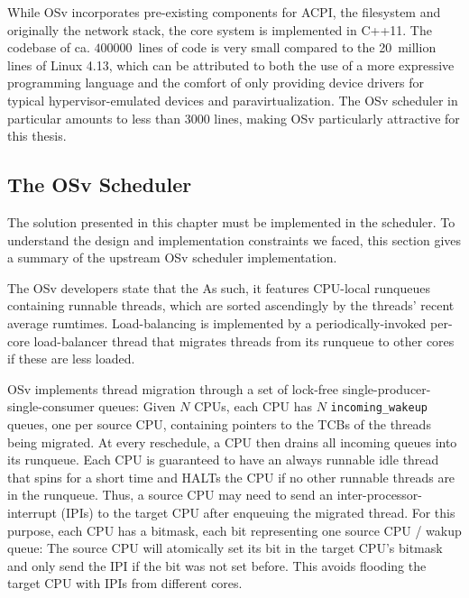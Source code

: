 \documentclass[12pt,a4paper]{book}
\begin{document}
While OSv incorporates pre-existing components for ACPI, the filesystem and originally the network stack, the core system is implemented in C++11.
The codebase of ca. $400000$~lines of code is very small compared to the 20~million lines of Linux 4.13, %
which can be attributed to both the use of a more expressive programming language and the comfort of only providing device drivers for typical hypervisor-emulated devices and paravirtualization.
The OSv scheduler in particular amounts to less than 3000 lines, making OSv particularly attractive for this thesis.%
~\cite{osvMain}

\subsection{The OSv Scheduler}\label{ch:di:osv:sched}
The solution presented in this chapter must be implemented in the scheduler.
To understand the design and implementation constraints we faced, this section gives a summary of the upstream OSv scheduler implementation.

The OSv developers state that the 
As such, it features CPU-local runqueues containing runnable threads, which are sorted ascendingly by the threads' recent average rumtimes.
Load-balancing is implemented by a periodically-invoked per-core load-balancer thread that migrates threads from its runqueue to other cores if these are less loaded.~\cite{osvMain}

OSv implements thread migration through a set of lock-free single-producer-single-consumer queues:
Given $N$ CPUs, each CPU has $N$ \texttt{incoming\_wakeup} queues, one per source CPU, containing pointers to the TCBs of the threads being migrated.
At every reschedule, a CPU then drains all incoming queues into its runqueue.
Each CPU is guaranteed to have an always runnable idle thread that spins for a short time and HALTs the CPU if no other runnable threads are in the runqueue.
Thus, a source CPU may need to send an inter-processor-interrupt (IPIs) to the target CPU after enqueuing the migrated thread.
For this purpose, each CPU has a bitmask, each bit representing one source CPU / wakup queue:
The source CPU will atomically set its bit in the target CPU's bitmask and only send the IPI if the bit was not set before.
This avoids flooding the target CPU with IPIs from different cores.~\cite{osvGit,osvMain}
\end{document}
